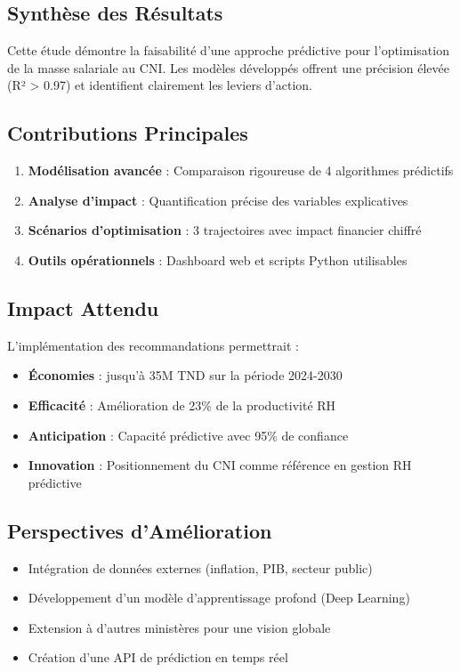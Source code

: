 \documentclass[12pt,a4paper]{article}
\begin{document}
\subsection{Synthèse des Résultats}
Cette étude démontre la faisabilité d'une approche prédictive pour l'optimisation de la masse salariale au CNI. Les modèles développés offrent une précision élevée (R² > 0.97) et identifient clairement les leviers d'action.

\subsection{Contributions Principales}
\begin{enumerate}
    \item \textbf{Modélisation avancée} : Comparaison rigoureuse de 4 algorithmes prédictifs
    \item \textbf{Analyse d'impact} : Quantification précise des variables explicatives
    \item \textbf{Scénarios d'optimisation} : 3 trajectoires avec impact financier chiffré
    \item \textbf{Outils opérationnels} : Dashboard web et scripts Python utilisables
\end{enumerate}

\subsection{Impact Attendu}
L'implémentation des recommandations permettrait :
\begin{itemize}
    \item \textbf{Économies} : jusqu'à 35M TND sur la période 2024-2030
    \item \textbf{Efficacité} : Amélioration de 23\% de la productivité RH
    \item \textbf{Anticipation} : Capacité prédictive avec 95\% de confiance
    \item \textbf{Innovation} : Positionnement du CNI comme référence en gestion RH prédictive
\end{itemize}

\subsection{Perspectives d'Amélioration}
\begin{itemize}
    \item Intégration de données externes (inflation, PIB, secteur public)
    \item Développement d'un modèle d'apprentissage profond (Deep Learning)
    \item Extension à d'autres ministères pour une vision globale
    \item Création d'une API de prédiction en temps réel
\end{itemize}
\end{document}
